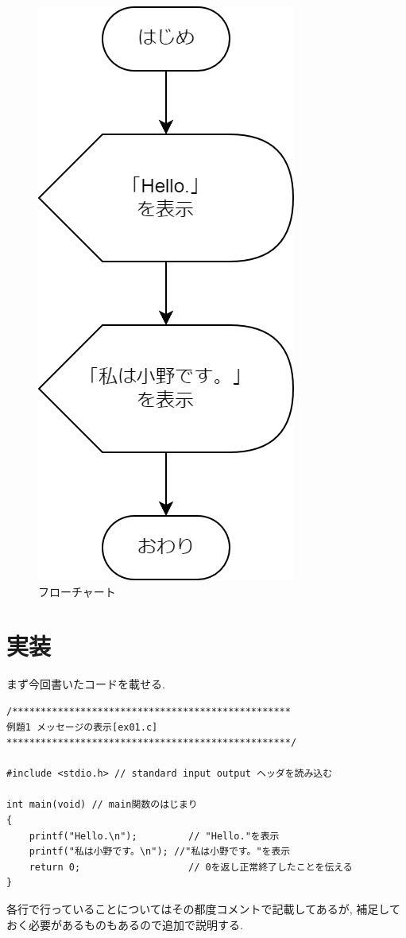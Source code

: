 \documentclass[a4paper, xelatex, ja=standard, 10.5pt]{bxjsarticle}
\begin{document}
\begin{figure}[H]
\centering
\includegraphics[scale=0.5]{img/flowchart.drawio.png}
\caption{フローチャート}
\label{}
\end{figure}

\section{実装}
まず今回書いたコードを載せる.
\begin{lstlisting}[caption=ソースコード,label=s01]
/*************************************************
例題1 メッセージの表示[ex01.c]
**************************************************/

#include <stdio.h> // standard input output ヘッダを読み込む

int main(void) // main関数のはじまり
{
    printf("Hello.\n");         // "Hello."を表示
    printf("私は小野です。\n"); //"私は小野です。"を表示
    return 0;                   // 0を返し正常終了したことを伝える
}
\end{lstlisting}
各行で行っていることについてはその都度コメントで記載してあるが,
補足しておく必要があるものもあるので追加で説明する.
\end{document}
